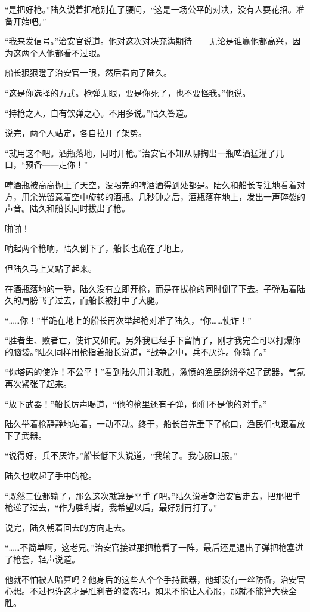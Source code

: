 “是把好枪。”陆久说着把枪别在了腰间，“这是一场公平的对决，没有人耍花招。准备开始吧。”

“我来发信号。”治安官说道。他对这次对决充满期待——无论是谁赢他都高兴，因为这两个人他都看不过眼。

船长狠狠瞪了治安官一眼，然后看向了陆久。

“这是你选择的方式。枪弹无眼，要是你死了，也不要怪我。”他说。

“持枪之人，自有饮弹之心。不用多说。”陆久答道。

说完，两个人站定，各自拉开了架势。

“就用这个吧。酒瓶落地，同时开枪。”治安官不知从哪掏出一瓶啤酒猛灌了几口，“预备——走你！”

啤酒瓶被高高抛上了天空，没喝完的啤酒洒得到处都是。陆久和船长专注地看着对方，用余光留意着空中旋转的酒瓶。几秒钟之后，酒瓶落在地上，发出一声碎裂的声音。陆久和船长同时拔出了枪。

啪啪！

响起两个枪响，陆久倒下了，船长也跪在了地上。

但陆久马上又站了起来。

在酒瓶落地的一瞬，陆久没有立即开枪，而是在拔枪的同时倒了下去。子弹贴着陆久的肩膀飞了过去，而船长被打中了大腿。

“……你！”半跪在地上的船长再次举起枪对准了陆久，“你……使诈！”

“胜者生、败者亡，使诈又如何。另外我已经手下留情了，刚才我完全可以打爆你的脑袋。”陆久同样用枪指着船长说道，“战争之中，兵不厌诈。你输了。”

“你塔码的使诈！不公平！”看到陆久用计取胜，激愤的渔民纷纷举起了武器，气氛再次紧张了起来。

“放下武器！”船长厉声喝道，“他的枪里还有子弹，你们不是他的对手。”

陆久举着枪静静地站着，一动不动。终于，船长首先垂下了枪口，渔民们也跟着放下了武器。

“说得好，兵不厌诈。”船长低下头说道，“我输了。我心服口服。”

陆久也收起了手中的枪。

“既然二位都输了，那么这次就算是平手了吧。”陆久说着朝治安官走去，把那把手枪递了过去，“作为胜利者，我希望以后，最好别再打了。”

说完，陆久朝着回去的方向走去。

“……不简单啊，这老兄。”治安官接过那把枪看了一阵，最后还是退出子弹把枪塞进了枪套，轻声说道。

他就不怕被人暗算吗？他身后的这些人个个手持武器，他却没有一丝防备，治安官心想。不过也许这才是胜利者的姿态吧，如果不能让人心服，那就不能算大获全胜。


